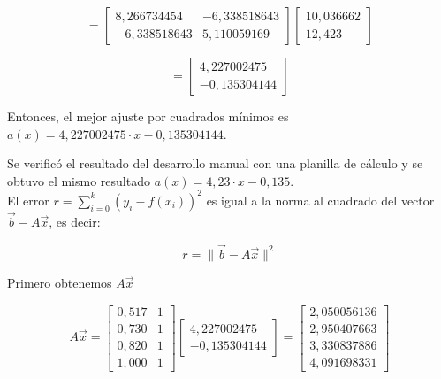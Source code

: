 \begin{equation}
    =
    \begin{bmatrix}
        8{,}266734454 & -6{,}338518643 \\
        -6{,}338518643 & 5{,}110059169
    \end{bmatrix}
    \begin{bmatrix}
        10{,}036662 \\
        12{,}423
    \end{bmatrix}
    \label{eq:cuadrados-minimos-solucion-3}
\end{equation}

\begin{equation}
    =
    \begin{bmatrix}
        4{,}227002475 \\
        -0{,}135304144
    \end{bmatrix}
    \label{eq:cuadrados-minimos-solucion-4}
\end{equation}

Entonces, el mejor ajuste por cuadrados mínimos es $a(x) = 4{,}227002475 \cdot x -0{,}135304144$.

Se verificó el resultado del desarrollo manual con una planilla de cálculo y se obtuvo el mismo resultado $a(x) = 4{,}23 \cdot x -0{,}135$.\\

El error $r = \sum_{i=0}^{k} (y_i - f(x_i))^2$ es igual a la norma al cuadrado del vector $\vec{b} - A\vec{x}$, es decir:

\begin{equation}
    r = \|\vec{b} - A\vec{x}\|^2
    \label{eq:error-cuadrados-minimos}
\end{equation}

Primero obtenemos $A\vec{x}$

\begin{equation}
    A\vec{x} =
    \begin{bmatrix}
        0{,}517 & 1 \\
        0{,}730 & 1 \\
        0{,}820 & 1 \\
        1{,}000 & 1
    \end{bmatrix}
    \begin{bmatrix}
        4{,}227002475 \\
        -0{,}135304144
    \end{bmatrix}
    =
    \begin{bmatrix}
        2{,}050056136 \\
        2{,}950407663 \\
        3{,}330837886 \\
        4{,}091698331
    \end{bmatrix}
    \label{eq:error-cuadrados-minimos-Ax}
\end{equation}

